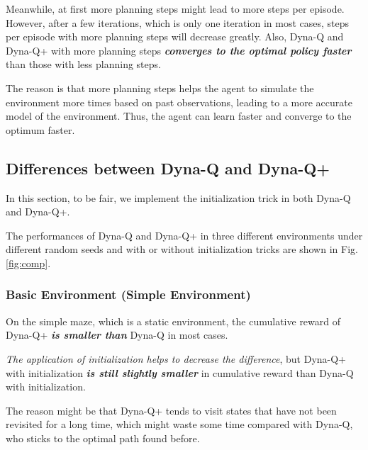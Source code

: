 \documentclass{article}
\begin{document}
    \hspace{0.7em}
    Meanwhile, at first more planning steps might lead to more steps per episode. However, after a few iterations, which is only one iteration in most cases, steps per episode with more planning steps will decrease greatly. Also, Dyna-Q and Dyna-Q+ with more planning steps \textbf{\emph{converges to the optimal policy faster}} than those with less planning steps.

    \hspace{0.7em}
    The reason is that more planning steps helps the agent to simulate the environment more times based on past observations, leading to a more accurate model of the environment. Thus, the agent can learn faster and converge to the optimum faster.

\vspace{1.5em}
\subsection{Differences between Dyna-Q and Dyna-Q+}
\vspace{1em}
    \hspace{2em}
    In this section, to be fair, we implement the initialization trick in both Dyna-Q and Dyna-Q+.

    \hspace{0.7em}
    The performances of Dyna-Q and Dyna-Q+ in three different environments under different random seeds and with or without initialization tricks are shown in Fig.\ref{fig:comp}.

    \vspace{1em} 
    \subsubsection{Basic Environment (Simple Environment)}

    \hspace{2em}
    On the simple maze, which is a static environment, the cumulative reward of Dyna-Q+ \textbf{\emph{is smaller than}} Dyna-Q in most cases. 
    
    \hspace{0.7em}
    \emph{The application of initialization helps to decrease the difference}, but Dyna-Q+ with initialization \textbf{\emph{is still slightly smaller}} in cumulative reward than Dyna-Q with initialization.
    
    \hspace{0.7em}
    The reason might be that Dyna-Q+ tends to visit states that have not been revisited for a long time, which might waste some time compared with Dyna-Q, who sticks to the optimal path found before.
\end{document}
